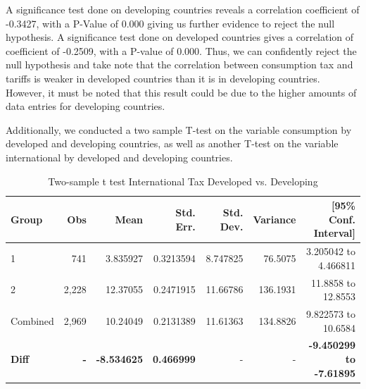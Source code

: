 \documentclass[12pt]{article}
\begin{document}
A significance test done on developing countries reveals a correlation coefficient of -0.3427, with a P-Value of 0.000 giving us further evidence to reject the null hypothesis. A significance test done on developed countries gives a correlation of coefficient of -0.2509, with a P-value of 0.000. Thus, we can confidently reject the null hypothesis and take note that the correlation between consumption tax and tariffs is weaker in developed countries than it is in developing countries. However, it must be noted that this result could be due to the higher amounts of data entries for developing countries. 

Additionally, we conducted a two sample T-test on the variable consumption by developed and developing countries, as well as another T-test on the variable international by developed and developing countries.

\begin{table}[H]
\centering
\caption{Two-sample t test International Tax Developed vs. Developing}
\label{tab:ttest_updated}
\renewcommand{\arraystretch}{1.2} %
\begin{tabular}{|l|r|r|r|r|r|r|}
\hline
\textbf{Group} & \textbf{Obs} & \textbf{Mean} & \textbf{Std. Err.} & \textbf{Std. Dev.} & \textbf{Variance} & \textbf{[95\% Conf. Interval]} \\ \hline
1              & 741          & 3.835927      & 0.3213594          & 8.747825          & 76.5075          & 3.205042 to 4.466811           \\ \hline
2              & 2,228        & 12.37055      & 0.2471915          & 11.66786          & 136.1931         & 11.8858 to 12.8553             \\ \hline
Combined       & 2,969        & 10.24049      & 0.2131389          & 11.61363          & 134.8826         & 9.822573 to 10.6584            \\ \hline
\textbf{Diff}  & \textbf{-}   & \textbf{-8.534625} & \textbf{0.466999} & -                  & -               & \textbf{-9.450299 to -7.61895} \\ \hline
\end{tabular}
\end{table}
\end{document}
